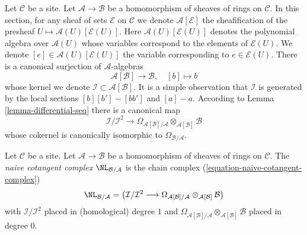 \medskip\noindent
Let $\mathcal{C}$ be a site. Let $\mathcal{A} \to \mathcal{B}$ be a
homomorphism of sheaves of rings on $\mathcal{C}$. In this section,
for any sheaf of sets $\mathcal{E}$ on $\mathcal{C}$ we denote
 $\mathcal{A}[\mathcal{E}]$ the sheafification
of the presheaf $U \mapsto \mathcal{A}(U)[\mathcal{E}(U)]$. Here
$\mathcal{A}(U)[\mathcal{E}(U)]$
denotes the polynomial algebra over $\mathcal{A}(U)$
whose variables correspond to the elements of $\mathcal{E}(U)$.
We denote $[e] \in \mathcal{A}(U)[\mathcal{E}(U)]$ the variable
corresponding to $e \in \mathcal{E}(U)$.
There is a canonical surjection of $\mathcal{A}$-algebras
\begin{equation}
\label{equation-canonical-presentation}
\mathcal{A}[\mathcal{B}] \longrightarrow \mathcal{B},\quad [b] \longmapsto b
\end{equation}
whose kernel we denote $\mathcal{I} \subset \mathcal{A}[\mathcal{B}]$.
It is a simple observation that $\mathcal{I}$ is generated by the
local sections $[b][b'] - [bb']$ and $[a] - a$. According to
Lemma \ref{lemma-differential-seq} there is a canonical map
\begin{equation}
\label{equation-naive-cotangent-complex}
\mathcal{I}/\mathcal{I}^2
\longrightarrow
\Omega_{\mathcal{A}[\mathcal{B}]/\mathcal{A}}
\otimes_{\mathcal{A}[\mathcal{B}]} \mathcal{B}
\end{equation}
whose cokernel is canonically isomorphic to $\Omega_{\mathcal{B}/\mathcal{A}}$.

\begin{definition}
\label{definition-naive-cotangent-complex}
Let $\mathcal{C}$ be a site. Let $\mathcal{A} \to \mathcal{B}$ be a
homomorphism of sheaves of rings on $\mathcal{C}$.
The {\it naive cotangent complex} $\NL_{\mathcal{B}/\mathcal{A}}$
is the chain complex (\ref{equation-naive-cotangent-complex})
$$
\NL_{\mathcal{B}/\mathcal{A}} =
\left(\mathcal{I}/\mathcal{I}^2
\longrightarrow
\Omega_{\mathcal{A}[\mathcal{B}]/\mathcal{A}}
\otimes_{\mathcal{A}[\mathcal{B}]} \mathcal{B}\right)
$$
with $\mathcal{I}/\mathcal{I}^2$ placed in (homological) degree $1$ and
$\Omega_{\mathcal{A}[\mathcal{B}]/\mathcal{A}}
\otimes_{\mathcal{A}[\mathcal{B}]} \mathcal{B}$
placed in degree $0$.
\end{definition}

